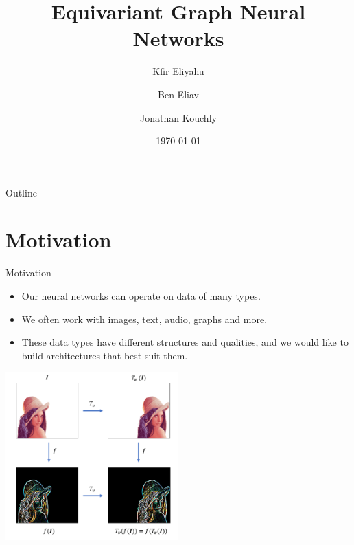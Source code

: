 \documentclass{beamer}
\title[Equivariant Graph Neural Networks]{Equivariant Graph Neural Networks}
\author[Kfir Eliyahu, Ben Eliav, Jonathan Kouchly]{Kfir Eliyahu \and Ben Eliav \and Jonathan Kouchly}
\date{\today} %
\begin{document}
\begin{frame}
    \titlepage
\end{frame}

\begin{frame}{Outline}
    \tableofcontents
\end{frame}


\section{Motivation}




\begin{frame}{Motivation}
\begin{itemize}
    \setlength{\itemsep}{\fill}
    \item Our neural networks can operate on data of many types.
    \pause
    \item We often work with images, text, audio, graphs and more.
    \pause
    \item These data types have different structures and qualities, and we would like to build architectures that best suit them.
    \end{itemize}
    \pause
    \begin{center}
        \includegraphics[width=0.5\textwidth]{../figures/equivariance.png}
    \end{center}
\end{frame}
\end{document}
